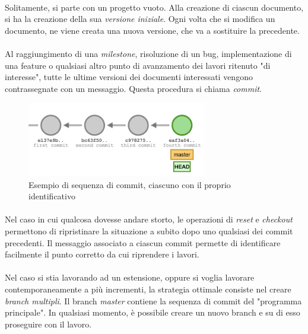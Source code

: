 \documentclass[12pt,a4paper,twoside,english,italian]{book}
\begin{document}
\paragraph{} Solitamente, si parte con un progetto vuoto. Alla creazione di ciascun documento, si ha la creazione della sua \emph{versione iniziale}. Ogni volta che si modifica un documento, ne viene creata una nuova versione, che va a sostituire la precedente. 

\paragraph{} Al raggiungimento di una \emph{milestone}, risoluzione di un bug, implementazione di una feature o qualsiasi altro punto di avanzamento dei lavori ritenuto "di interesse", tutte le ultime versioni dei documenti interessati vengono contrassegnate con un messaggio. Questa procedura si chiama \emph{commit}.

\begin{figure}[H]
    \centering
    \includegraphics[width=0.7\textwidth]{img/git-history.png}
    \caption{Esempio di sequenza di commit, ciascuno con il proprio identificativo}
\end{figure}

\paragraph{} Nel caso in cui qualcosa dovesse andare storto, le operazioni di \emph{reset} e \emph{checkout} permettono di ripristinare la situazione a subito dopo uno qualsiasi dei commit precedenti. Il messaggio associato a ciascun commit permette di identificare facilmente il punto corretto da cui riprendere i lavori. 

\paragraph{} Nel caso si stia lavorando ad un estensione, oppure si voglia lavorare contemporaneamente a più incrementi, la strategia ottimale consiste nel creare \emph{branch multipli}. Il branch \emph{master} contiene la sequenza di commit del "programma principale". In qualsiasi momento, è possibile creare un nuovo branch e su di esso proseguire con il lavoro. 
\end{document}
